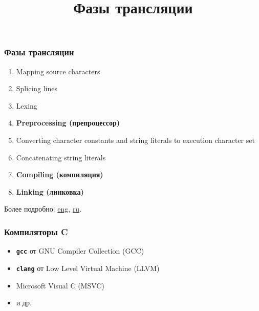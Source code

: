 \documentclass[compress, 8pt, aspectratio=169]{beamer}
\title{Фазы трансляции}
\begin{document}
\frame[plain]{\titlepage}


\begin{frame}

    \frametitle{Фазы трансляции}

    \begin{enumerate}

        \item Mapping source characters

        \item Splicing lines

        \item Lexing

        \item \textbf{Preprocessing (препроцессор)}

        \item Converting character constants and string literals
            to execution character set

        \item Concatenating string literals

        \item \textbf{Compiling (компиляция)}

        \item \textbf{Linking (линковка)}

    \end{enumerate}

    \bigbreak

    Более подробно:
    \href{https://en.cppreference.com/w/c/language/translation_phases}
        {eng},
    \href{https://ru.cppreference.com/w/c/language/translation_phases}
        {ru}.

\end{frame}


\begin{frame}

    \frametitle{Компиляторы C}

    \begin{itemize}

        \item \texttt{\textbf{gcc}} от GNU Compiler Collection (GCC)

        \item \texttt{\textbf{clang}} от Low Level Virtual Machine (LLVM)

        \item Microsoft Visual C (MSVC)

        \item и др.

    \end{itemize}

\end{frame}
\end{document}
